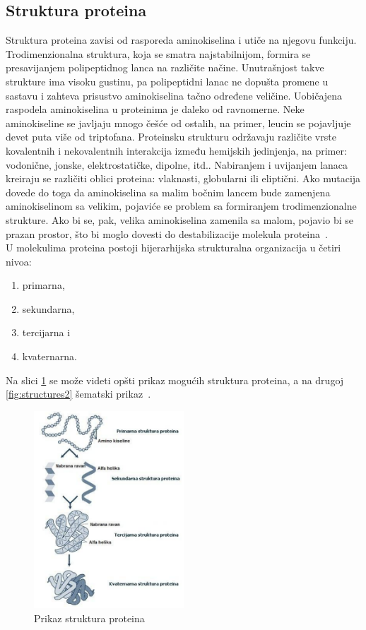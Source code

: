 \subsection{Struktura proteina}
Struktura proteina zavisi od rasporeda aminokiselina i utiče na njegovu funkciju. Trodimenzionalna struktura, koja se smatra najstabilnijom, formira se presavijanjem polipeptidnog lanca na različite načine. Unutrašnjost takve strukture ima visoku gustinu, pa polipeptidni lanac ne dopušta promene u sastavu i zahteva prisustvo aminokiselina tačno određene veličine. Uobičajena raspodela aminokiselina u proteinima je daleko od ravnomerne. Neke aminokiseline se javljaju mnogo češće od ostalih, na primer, leucin se pojavljuje devet puta više od triptofana.
Proteinsku strukturu održavaju različite vrste kovalentnih i nekovalentnih interakcija između hemijskih jedinjenja, na primer: vodonične, jonske, elektrostatičke, dipolne, itd.. Nabiranjem i uvijanjem lanaca kreiraju se različiti oblici proteina: vlaknasti, globularni ili eliptični. Ako mutacija dovede do toga da aminokiselina sa malim bočnim lancem bude zamenjena aminokiselinom sa velikim, pojaviće se problem sa formiranjem trodimenzionalne strukture. Ako bi se, pak, velika aminokiselina zamenila sa malom, pojavio bi se prazan prostor, što bi moglo dovesti do destabilizacije molekula proteina~\cite{spasic,biopathways,medbio}. \\
U molekulima proteina postoji hijerarhijska strukturalna organizacija u četiri nivoa:
\begin{enumerate}
\item primarna,
\item sekundarna,
\item tercijarna i
\item kvaternarna.
\end{enumerate}
Na slici \ref{fig:structures} se može videti opšti prikaz mogućih struktura proteina, a na drugoj \ref{fig:structures2} šematski prikaz~\cite{spasic}.
\begin{figure}[h]
	\centering
    \includegraphics[width=0.5\textwidth]{Figures/BO/protein_structures.png}
    \caption{Prikaz struktura proteina}
    \label{fig:structures}
\end{figure}
